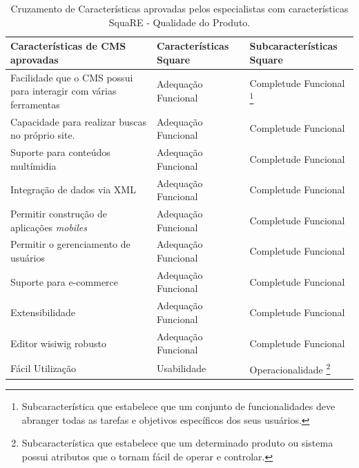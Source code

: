 	\begin{longtable}{|p{140pt}|p{140pt}|p{120pt}|}
	
	\caption{Cruzamento de Características aprovadas pelos especialistas com características SquaRE - Qualidade do Produto.}
	\label{mapeamento_CMS_características_aprovadas}\\

 	\hline
 	 {\raggedright \textbf{Características de CMS aprovadas}}
 	 & {\raggedright \textbf{Características Square}}
 	 & {\raggedright \textbf{Subcaracterísticas Square}}\\
 	\hline
 	 {\raggedright Facilidade que o CMS possui para interagir com várias ferramentas}
 	 & {\raggedright Adequação Funcional}
 	 & {\raggedright Completude Funcional \footnote{Subcaracterística que estabelece que um conjunto de funcionalidades deve abranger todas as tarefas e objetivos específicos dos seus usuários.}}\\
 	\hline
 	 {\raggedright Capacidade para realizar buscas no próprio site.}
 	 & {\raggedright Adequação Funcional}
 	 & {\raggedright Completude Funcional}\\
 	\hline
 	 {\raggedright Suporte para conteúdos multímidia} 
 	 & {\raggedright Adequação Funcional}
& {\raggedright Completude Funcional}\\
 	\hline
{\raggedright Integração de dados via XML}
 	 & {\raggedright Adequação Funcional}
 	 & {\raggedright Completude Funcional}\\
 	\hline
 	 {\raggedright Permitir construção de aplicações \textit{mobiles}}
 	 & {\raggedright Adequação Funcional}
 	 & {\raggedright Completude Funcional}\\
 	\hline
{\raggedright Permitir o gerenciamento de usuários}
 	 & {\raggedright Adequação Funcional}
 	 & {\raggedright Completude Funcional}\\
 	\hline
 	 {\raggedright Suporte para e-commerce}
 	 & {\raggedright Adequação Funcional}
 	 & {\raggedright Completude Funcional}\\
 	\hline
{\raggedright Extensibilidade}
 	 & {\raggedright Adequação Funcional}
 	 & {\raggedright Completude Funcional}\\
 	\hline
{\raggedright Editor wisiwig robusto}
 	 & {\raggedright Adequação Funcional}
 	 & {\raggedright Completude Funcional}\\
 	\hline
 	 {\raggedright Fácil Utilização}
 	 & {\raggedright Usabilidade}
 	 & {\raggedright Operacionalidade \footnote{Subcaracterística que estabelece que um determinado produto ou sistema possui atributos que o tornam fácil de operar e controlar.}}\\

\end{longtable}

